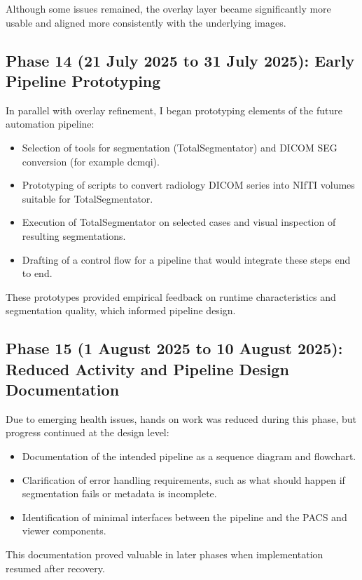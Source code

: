 \documentclass[11pt,a4paper]{article}
\begin{document}
Although some issues remained, the overlay layer became significantly more usable and aligned more consistently with the underlying images.

\subsection*{Phase 14 (21 July 2025 to 31 July 2025): Early Pipeline Prototyping}

In parallel with overlay refinement, I began prototyping elements of the future automation pipeline:

\begin{itemize}
    \item Selection of tools for segmentation (TotalSegmentator) and DICOM SEG conversion (for example dcmqi).
    \item Prototyping of scripts to convert radiology DICOM series into NIfTI volumes suitable for TotalSegmentator.
    \item Execution of TotalSegmentator on selected cases and visual inspection of resulting segmentations.
    \item Drafting of a control flow for a pipeline that would integrate these steps end to end.
\end{itemize}

These prototypes provided empirical feedback on runtime characteristics and segmentation quality, which informed pipeline design.

\subsection*{Phase 15 (1 August 2025 to 10 August 2025): Reduced Activity and Pipeline Design Documentation}

Due to emerging health issues, hands on work was reduced during this phase, but progress continued at the design level:

\begin{itemize}
    \item Documentation of the intended pipeline as a sequence diagram and flowchart.
    \item Clarification of error handling requirements, such as what should happen if segmentation fails or metadata is incomplete.
    \item Identification of minimal interfaces between the pipeline and the PACS and viewer components.
\end{itemize}

This documentation proved valuable in later phases when implementation resumed after recovery.
\end{document}

